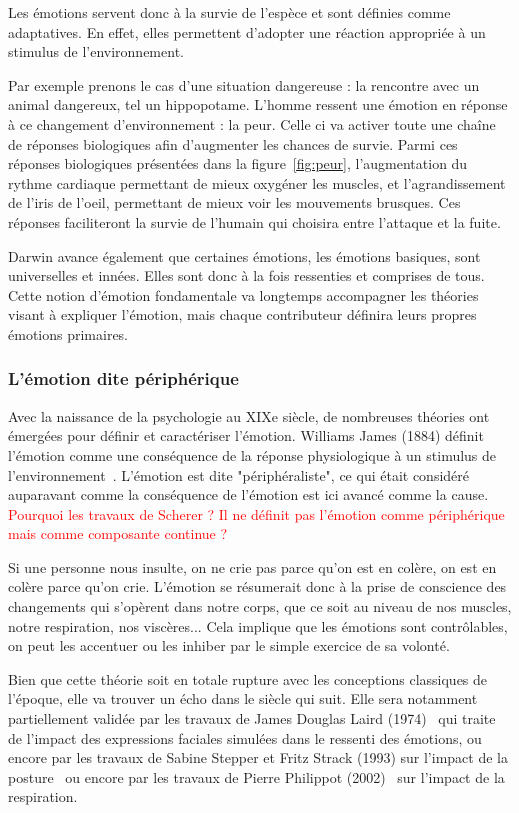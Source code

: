 Les émotions servent donc à la survie de l’espèce et sont définies comme adaptatives. En effet, elles permettent d'adopter une réaction appropriée à un stimulus de l'environnement.

Par exemple prenons le cas d'une situation dangereuse : la rencontre avec un animal dangereux, tel un hippopotame. L'homme ressent une émotion en réponse à ce changement d'environnement : la peur. Celle ci va activer toute une chaîne de réponses biologiques afin d'augmenter les chances de survie. Parmi ces réponses biologiques présentées dans la figure~\ref{fig:peur}, l'augmentation du rythme cardiaque permettant de mieux oxygéner les muscles, et l'agrandissement de l'iris de l'oeil, permettant de mieux voir les mouvements brusques. Ces réponses faciliteront la survie de l'humain qui choisira entre l'attaque et la fuite.



Darwin avance également que certaines émotions, les émotions basiques, sont universelles et innées. Elles sont donc à la fois ressenties et comprises de tous. Cette notion d'émotion fondamentale va longtemps accompagner les théories visant à expliquer l'émotion, mais chaque contributeur définira leurs propres émotions primaires.

\subsubsection{L'émotion dite périphérique}
Avec la naissance de la psychologie au XIXe siècle, de nombreuses théories ont émergées pour définir et caractériser l'émotion. Williams James (1884) définit l'émotion comme une conséquence de la réponse physiologique à un stimulus de l'environnement~\cite{James1884}. L'émotion est dite "périphéraliste", ce qui était considéré auparavant comme la conséquence de l’émotion est ici avancé comme la cause. \textcolor{red}{Pourquoi les travaux de Scherer ? Il ne définit pas l'émotion comme périphérique mais comme composante continue ?}

Si une personne nous insulte, on ne crie pas parce qu'on est en colère, on est en colère parce qu'on crie. L'émotion se résumerait donc à la prise de conscience des changements qui s'opèrent dans notre corps, que ce soit au niveau de nos muscles, notre respiration, nos viscères... Cela implique que les émotions sont contrôlables, on peut les accentuer ou les inhiber par le simple exercice de sa volonté.

Bien que cette théorie soit en totale rupture avec les conceptions classiques de l'époque, elle va trouver un écho dans le siècle qui suit. Elle sera notamment partiellement validée par les travaux de James Douglas Laird (1974)~\cite{Laird1974} qui traite de l'impact des expressions faciales simulées dans le ressenti des émotions, ou encore par les travaux de Sabine Stepper et Fritz Strack (1993) sur l'impact de la posture~\cite{Stepper1993} ou encore par les travaux de Pierre Philippot (2002)~\cite{Philippot2002} sur l'impact de la respiration.

